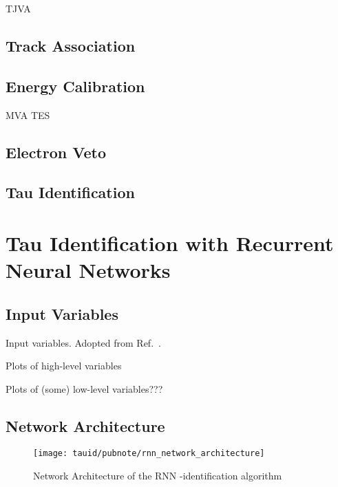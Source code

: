 TJVA


\subsection{Track Association}

\cite{duschinger}


\subsection{Energy Calibration}

MVA TES


\subsection{Electron Veto}

\subsection{Tau Identification}



\section{Tau Identification with Recurrent Neural Networks}

\subsection{Input Variables}

\begin{table}[htbp]
  \centering

  \caption{Input variables. Adopted from
    Ref.~\cite{ATL-PHYS-PUB-2019-033}.}%
  \label{tab:tauid_input_variables}

  
\end{table}

Plots of high-level variables

Plots of (some) low-level variables???


\subsection{Network Architecture}

\begin{figure}[htbp]
  \centering

  \texttt{[image: tauid/pubnote/rnn\_network\_architecture]}

  \caption{Network Architecture of the RNN \tauhad-identification
    algorithm \cite{ATL-PHYS-PUB-2019-033}}
  \label{fig:tauid_network_architecture}
\end{figure}

